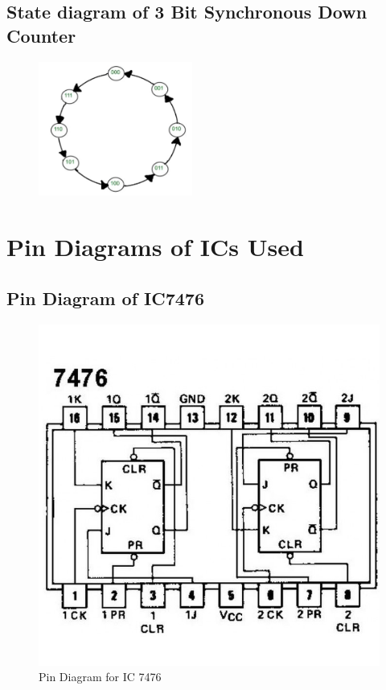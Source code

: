 \documentclass[11pt]{article}
\begin{document}
\subsection{State diagram of 3 Bit Synchronous Down Counter}

\begin{figure}[H]
	\centering
	\includegraphics[width=0.45\textwidth]{state diagram 3 bit synchronous.png}
	\label{fig:}
\end{figure}


\section{Pin Diagrams of ICs Used}

\subsection{Pin Diagram of IC7476}
\begin{figure}[H]
	\centering
	\includegraphics[scale = 0.35]{7476.jpg}
	\caption{Pin Diagram for IC 7476}
\end{figure}
\end{document}

